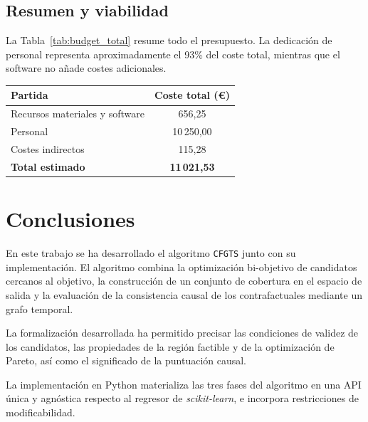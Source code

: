 \documentclass[12pt]{report} %
\begin{document}
\section{Resumen y viabilidad}

La Tabla~\ref{tab:budget_total} resume todo el presupuesto. La dedicación de personal representa aproximadamente el 93\% del coste total, mientras que el software no añade costes adicionales.
\begin{table}[H]
    {\begin{tabular}{|p{7.4cm}|c|}
            \hline
            \textbf{Partida}               & \textbf{Coste total (€)} \\
            \hline
            Recursos materiales y software & 656{,}25                 \\
            \hline
            Personal                       & 10\,250{,}00             \\
            \hline
            Costes indirectos              & 115{,}28                 \\
            \hline
            \textbf{Total estimado}        & \textbf{11\,021{,}53}    \\
            \hline
        \end{tabular}}
\end{table}

\chapter{Conclusiones}
\label{cap:conclusiones}

En este trabajo se ha desarrollado el algoritmo \texttt{CFGTS} junto con su implementación. El algoritmo combina la optimización bi-objetivo de candidatos cercanos al objetivo, la construcción de un conjunto de cobertura en el espacio de salida y la evaluación de la consistencia causal de los contrafactuales mediante un grafo temporal.

La formalización desarrollada ha permitido precisar las condiciones de validez de los candidatos, las propiedades de la región factible y de la optimización de Pareto, así como el significado de la puntuación causal.

La implementación en Python materializa las tres fases del algoritmo en una API única y agnóstica respecto al regresor de \textit{scikit-learn}, e incorpora restricciones de modificabilidad.
\end{document}
